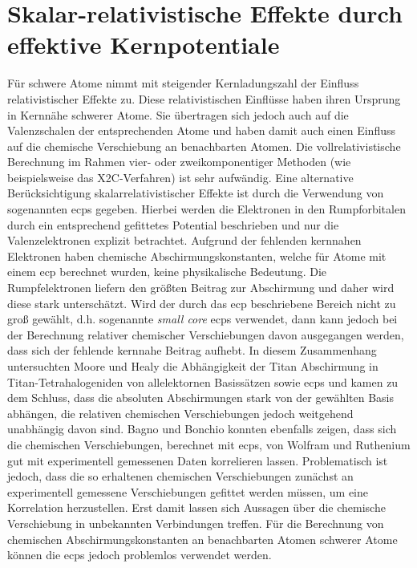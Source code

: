 \section{Skalar-relativistische Effekte durch effektive Kernpotentiale}
Für schwere Atome nimmt mit steigender Kernladungszahl der Einfluss relativistischer Effekte zu. Diese relativistischen Einflüsse haben ihren Ursprung in Kernnähe schwerer Atome. Sie übertragen sich jedoch auch auf die Valenzschalen der entsprechenden Atome und haben damit auch einen Einfluss auf die chemische Verschiebung an benachbarten Atomen. Die vollrelativistische Berechnung im Rahmen vier- oder zweikomponentiger Methoden (wie beispielsweise das X2C-Verfahren) ist sehr aufwändig. Eine alternative Berücksichtigung skalarrelativistischer Effekte ist durch die Verwendung von sogenannten \acp{ecp}\supercite{cundari1996effective,frenking2007pseudopotential} gegeben. Hierbei werden die Elektronen in den Rumpforbitalen durch ein entsprechend gefittetes Potential beschrieben und nur die Valenzelektronen explizit betrachtet. Aufgrund der fehlenden kernnahen Elektronen haben chemische Abschirmungskonstanten, welche für Atome mit einem \ac{ecp} berechnet wurden, keine physikalische Bedeutung. Die Rumpfelektronen liefern den größten Beitrag zur Abschirmung und daher wird diese stark unterschätzt. Wird der durch das \ac{ecp} beschriebene Bereich nicht zu groß gewählt, d.h. sogenannte \textit{small core} \acp{ecp} verwendet, dann kann jedoch bei der Berechnung relativer chemischer Verschiebungen davon ausgegangen werden, dass sich der fehlende kernnahe Beitrag aufhebt.\supercite{van2012use} In diesem Zusammenhang untersuchten Moore und Healy\supercite{moore1995ab} die Abhängigkeit der Titan Abschirmung in Titan-Tetrahalogeniden von allelektornen Basissätzen sowie \acp{ecp} und kamen zu dem Schluss, dass die absoluten Abschirmungen stark von der gewählten Basis abhängen, die relativen chemischen Verschiebungen jedoch weitgehend unabhängig davon sind. Bagno und Bonchio konnten ebenfalls zeigen, dass sich die chemischen Verschiebungen, berechnet mit \acp{ecp}, von Wolfram\supercite{bagno2000effective} und Ruthenium\supercite{bagno2002dft} gut mit experimentell gemessenen Daten korrelieren lassen. Problematisch ist jedoch, dass die so erhaltenen chemischen Verschiebungen zunächst an experimentell gemessene Verschiebungen gefittet werden müssen, um eine Korrelation herzustellen. Erst damit lassen sich Aussagen über die chemische Verschiebung in unbekannten Verbindungen treffen. Für die Berechnung von chemischen Abschirmungskonstanten an benachbarten Atomen schwerer Atome können die \acp{ecp} jedoch problemlos verwendet werden.
